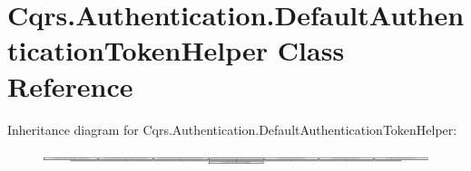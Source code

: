 \hypertarget{classCqrs_1_1Authentication_1_1DefaultAuthenticationTokenHelper}{}\section{Cqrs.\+Authentication.\+Default\+Authentication\+Token\+Helper Class Reference}
\label{classCqrs_1_1Authentication_1_1DefaultAuthenticationTokenHelper}
Inheritance diagram for Cqrs.\+Authentication.\+Default\+Authentication\+Token\+Helper\+:\begin{figure}[H]
\begin{center}
\leavevmode
\includegraphics[height=0.270270cm]{classCqrs_1_1Authentication_1_1DefaultAuthenticationTokenHelper}
\end{center}
\end{figure}
